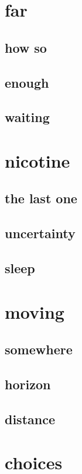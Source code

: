 \documentclass{article}
\begin{document}
\section{far}
\subsection{how so}

\clearpage
\subsection{enough}

\clearpage
\subsection{waiting}

\clearpage

\section{nicotine}
\subsection{the last one}

\clearpage
\subsection{uncertainty}

\clearpage
\subsection{sleep}

\clearpage


\section{moving}
\subsection{somewhere}

\clearpage
\subsection{horizon}

\clearpage
\subsection{distance}

\clearpage

\section{choices}
\end{document}
